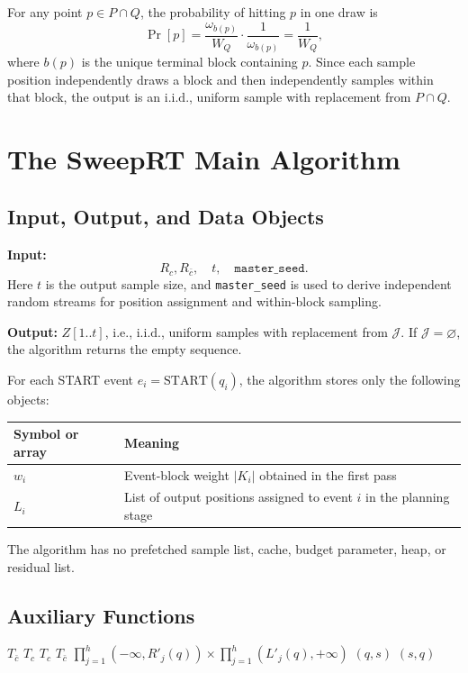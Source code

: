 \documentclass[11pt]{article}
\newcommand{\Rc}{R_c}
\newcommand{\Rbar}{R_{\bar c}}
\newcommand{\Start}{\mathrm{START}}
\newcommand{\J}{\mathcal J}
\newcommand{\iid}{\mathrm{i.i.d.}}
\begin{document}
For any point \(p\in P\cap Q\), the probability of hitting \(p\) in one draw is
\[
 \Pr[p]
 =\frac{\omega_{b(p)}}{W_Q}\cdot\frac1{\omega_{b(p)}}
 =\frac1{W_Q},
\]
where \(b(p)\) is the unique terminal block containing \(p\). Since each sample position independently draws a block and then independently samples within that block, the output is an \(\iid\), uniform sample with replacement from \(P\cap Q\).

\section{The SweepRT Main Algorithm}

\subsection{Input, Output, and Data Objects}

\textbf{Input:}
\[
 \Rc,\Rbar,\quad t,\quad \texttt{master\_seed}.
\]
Here \(t\) is the output sample size, and \texttt{master\_seed} is used to derive independent random streams for position assignment and within-block sampling.

\textbf{Output:} \(Z[1..t]\), i.e., \(\iid\), uniform samples with replacement from \(\J\). If \(\J=\varnothing\), the algorithm returns the empty sequence.

For each START event \(e_i=\Start(q_i)\), the algorithm stores only the following objects:
\begin{center}
\begin{tabular}{ll}
\toprule
Symbol or array & Meaning \\
\midrule
\(w_i\) & Event-block weight \(|K_i|\) obtained in the first pass \\
\(L_i\) & List of output positions assigned to event \(i\) in the planning stage \\
\bottomrule
\end{tabular}
\end{center}
The algorithm has no prefetched sample list, cache, budget parameter, heap, or residual list.

\subsection{Auxiliary Functions}

\begin{algorithm}[t]
\caption{Auxiliary Functions for SweepRT}
\label{alg:helpers}
\begin{algorithmic}[1]
    \If{$q\in\Rc$} \State \Return $T_{\bar c}$
    \Else \State \Return $T_c$
    \EndIf
\EndFunction
\Statex
{}
    \If{$q\in\Rc$} \State \Return $T_c$
    \Else \State \Return $T_{\bar c}$
    \EndIf
\EndFunction
\Statex
{}
    \State \Return $\prod_{j=1}^{h}(-\infty,R'_j(q))\times\prod_{j=1}^{h}(L'_j(q),+\infty)$
\EndFunction
\Statex
{}
    \If{$q\in\Rc$} \State \Return $(q,s)$
    \Else \State \Return $(s,q)$
    \EndIf
\EndFunction
\end{algorithmic}
\end{algorithm}
\end{document}
